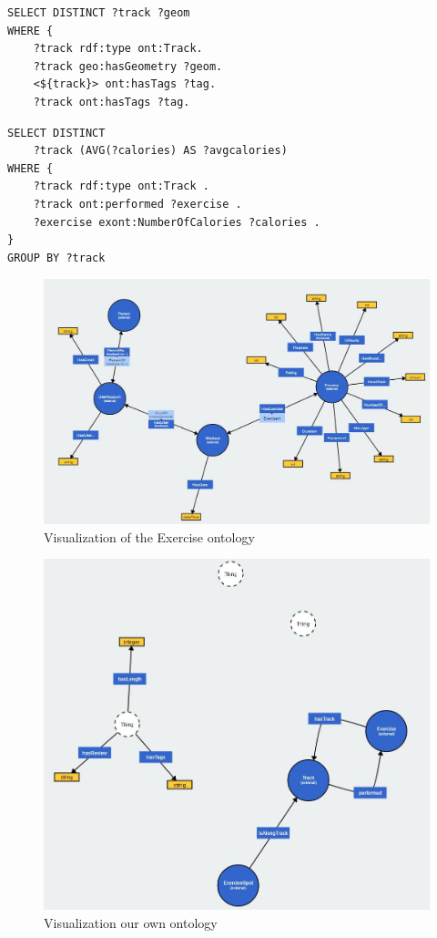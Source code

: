 \documentclass[11pt,a4paper]{scrreprt}
\begin{document}
\begin{lstlisting}[caption={Query for tracks with a tag common with a specified track }, label = query:trackstags ]
SELECT DISTINCT ?track ?geom
WHERE {
    ?track rdf:type ont:Track.
    ?track geo:hasGeometry ?geom.
    <${track}> ont:hasTags ?tag.
    ?track ont:hasTags ?tag.
\end{lstlisting}

\begin{lstlisting}[caption={Query for average calories burnt per track}, label=query:trackscalories]
SELECT DISTINCT
    ?track (AVG(?calories) AS ?avgcalories)
WHERE {
    ?track rdf:type ont:Track .
    ?track ont:performed ?exercise .
    ?exercise exont:NumberOfCalories ?calories .
}
GROUP BY ?track
\end{lstlisting}

\begin{figure}[h]
    \includegraphics[width=\textwidth]{exOntology.png}
    \caption{Visualization of the Exercise ontology}
    \label{db:exont}
\end{figure}
\begin{figure}[h]
    \includegraphics[width=\textwidth]{ownOntology.png}
    \caption{Visualization our own ontology}
    \label{db:ownont}
\end{figure}
\end{document}
